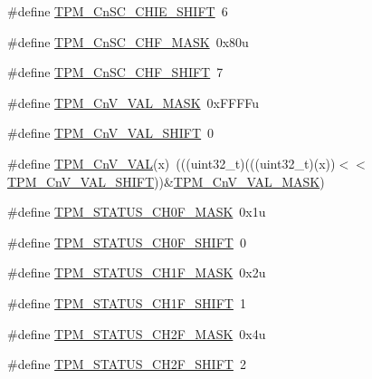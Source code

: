 \begin{DoxyCompactItemize}
\item 
\#define \hyperlink{group___t_p_m___register___masks_ga621c521a5a2376b0685156af85a93b56}{T\+P\+M\+\_\+\+Cn\+S\+C\+\_\+\+C\+H\+I\+E\+\_\+\+S\+H\+I\+FT}~6
\item 
\#define \hyperlink{group___t_p_m___register___masks_gac8ec8543edea61f3ebe7c98f09addd6c}{T\+P\+M\+\_\+\+Cn\+S\+C\+\_\+\+C\+H\+F\+\_\+\+M\+A\+SK}~0x80u
\item 
\#define \hyperlink{group___t_p_m___register___masks_ga070c2d7e35f829f8f2025682c04193d8}{T\+P\+M\+\_\+\+Cn\+S\+C\+\_\+\+C\+H\+F\+\_\+\+S\+H\+I\+FT}~7
\item 
\#define \hyperlink{group___t_p_m___register___masks_gab65cebe025551107c0b6dd05e5795ae5}{T\+P\+M\+\_\+\+Cn\+V\+\_\+\+V\+A\+L\+\_\+\+M\+A\+SK}~0x\+F\+F\+F\+Fu
\item 
\#define \hyperlink{group___t_p_m___register___masks_ga89562c16ce3c849bd51b1ba1e124b307}{T\+P\+M\+\_\+\+Cn\+V\+\_\+\+V\+A\+L\+\_\+\+S\+H\+I\+FT}~0
\item 
\#define \hyperlink{group___t_p_m___register___masks_ga28132959dec9653625c8f6d16c47d635}{T\+P\+M\+\_\+\+Cn\+V\+\_\+\+V\+AL}(x)~(((uint32\+\_\+t)(((uint32\+\_\+t)(x))$<$$<$\hyperlink{group___t_p_m___register___masks_ga89562c16ce3c849bd51b1ba1e124b307}{T\+P\+M\+\_\+\+Cn\+V\+\_\+\+V\+A\+L\+\_\+\+S\+H\+I\+FT}))\&\hyperlink{group___t_p_m___register___masks_gab65cebe025551107c0b6dd05e5795ae5}{T\+P\+M\+\_\+\+Cn\+V\+\_\+\+V\+A\+L\+\_\+\+M\+A\+SK})
\item 
\#define \hyperlink{group___t_p_m___register___masks_ga2441823dbe4ebc3b7f88773a95eff6d6}{T\+P\+M\+\_\+\+S\+T\+A\+T\+U\+S\+\_\+\+C\+H0\+F\+\_\+\+M\+A\+SK}~0x1u
\item 
\#define \hyperlink{group___t_p_m___register___masks_gab7b122b8ff741ae1bacff6a0929d7adc}{T\+P\+M\+\_\+\+S\+T\+A\+T\+U\+S\+\_\+\+C\+H0\+F\+\_\+\+S\+H\+I\+FT}~0
\item 
\#define \hyperlink{group___t_p_m___register___masks_gaed654f625ebff2d9f8a2cc89ef410330}{T\+P\+M\+\_\+\+S\+T\+A\+T\+U\+S\+\_\+\+C\+H1\+F\+\_\+\+M\+A\+SK}~0x2u
\item 
\#define \hyperlink{group___t_p_m___register___masks_ga531fc0daa18458bc1d781df31cffbfe9}{T\+P\+M\+\_\+\+S\+T\+A\+T\+U\+S\+\_\+\+C\+H1\+F\+\_\+\+S\+H\+I\+FT}~1
\item 
\#define \hyperlink{group___t_p_m___register___masks_ga151f2aa4b0d2eef94e75170580ca4c13}{T\+P\+M\+\_\+\+S\+T\+A\+T\+U\+S\+\_\+\+C\+H2\+F\+\_\+\+M\+A\+SK}~0x4u
\item 
\#define \hyperlink{group___t_p_m___register___masks_ga99af753c0fea3de796c9226db4d5c9f3}{T\+P\+M\+\_\+\+S\+T\+A\+T\+U\+S\+\_\+\+C\+H2\+F\+\_\+\+S\+H\+I\+FT}~2
$$
\end{DoxyCompactItemize}
